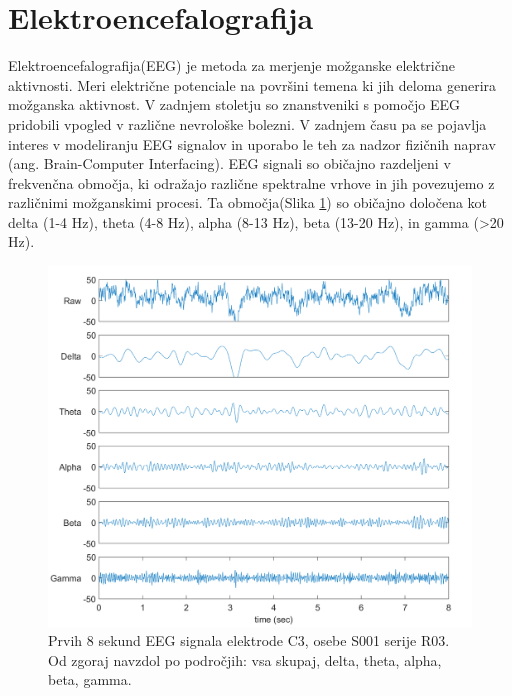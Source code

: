 \section{Elektroencefalografija}
Elektroencefalografija(EEG) je metoda za merjenje možganske električne aktivnosti. Meri električne potenciale na površini temena ki jih deloma generira možganska aktivnost. V zadnjem stoletju so znanstveniki s pomočjo EEG pridobili vpogled v različne nevrološke bolezni. V zadnjem času pa se pojavlja interes v modeliranju EEG signalov in uporabo le teh za nadzor fizičnih naprav (ang. Brain-Computer Interfacing). EEG signali so običajno razdeljeni v frekvenčna območja, ki odražajo različne spektralne vrhove in jih povezujemo z različnimi možganskimi procesi. Ta območja(Slika \ref{slika:eeg}) so običajno določena kot delta (1-4 Hz), theta (4-8 Hz), alpha (8-13 Hz), beta (13-20 Hz), in gamma (>20 Hz).
 \cite{nunezElectroencephalographyEEGNeurophysics2016}
 \begin{figure}[h]
    \begin{center}
    \includegraphics[width=1\linewidth]{slike/EEGSignals.png}
    \end{center}
    \caption[Frekvenčna območja EEG signala.]{Prvih 8 sekund EEG signala elektrode C3, osebe S001 serije R03. Od zgoraj navzdol po področjih: vsa skupaj, delta, theta, alpha, beta, gamma.}
    \label{slika:eeg}
    \end{figure}


